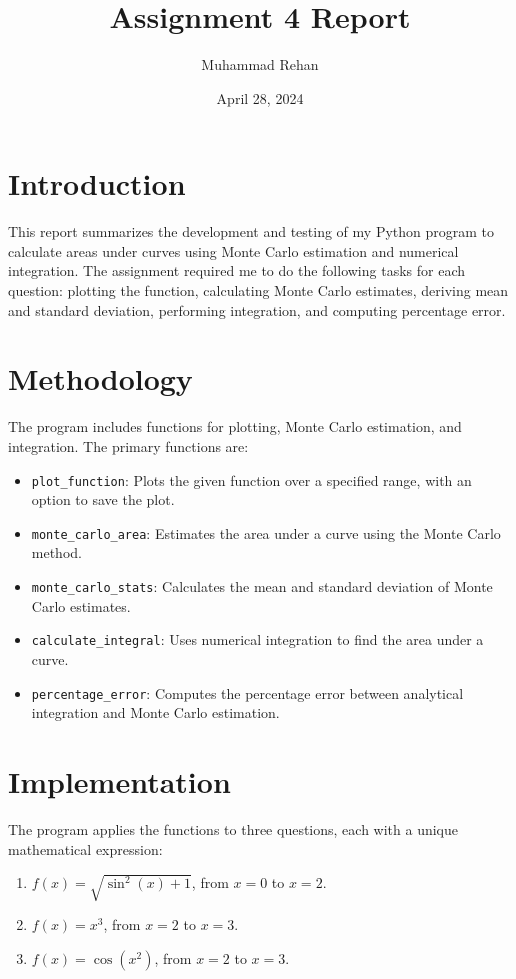 \documentclass{article}
\title{Assignment 4 Report}
\author{Muhammad Rehan}
\date{April 28, 2024}
\begin{document}
\maketitle

\section*{Introduction}
This report summarizes the development and testing of my Python program to calculate areas under curves using Monte Carlo estimation and numerical integration. The assignment required me to do the following tasks for each question: plotting the function, calculating Monte Carlo estimates, deriving mean and standard deviation, performing integration, and computing percentage error.

\section*{Methodology}
The program includes functions for plotting, Monte Carlo estimation, and integration. The primary functions are:
\begin{itemize}
    \item \texttt{plot\_function}: Plots the given function over a specified range, with an option to save the plot.
    \item \texttt{monte\_carlo\_area}: Estimates the area under a curve using the Monte Carlo method.
    \item \texttt{monte\_carlo\_stats}: Calculates the mean and standard deviation of Monte Carlo estimates.
    \item \texttt{calculate\_integral}: Uses numerical integration to find the area under a curve.
    \item \texttt{percentage\_error}: Computes the percentage error between analytical integration and Monte Carlo estimation.
\end{itemize}

\section*{Implementation}
The program applies the functions to three questions, each with a unique mathematical expression:
\begin{enumerate}
    \item \(f(x) = \sqrt{\sin^2(x) + 1}\), from \(x = 0\) to \(x = 2\).
    \item \(f(x) = x^3\), from \(x = 2\) to \(x = 3\).
    \item \(f(x) = \cos(x^2)\), from \(x = 2\) to \(x = 3\).
\end{enumerate}
\end{document}
